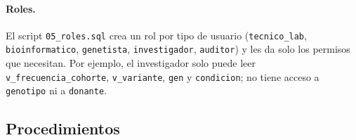 \paragraph{Roles.} El script \texttt{05\_\allowbreak{}roles.sql} crea un rol por tipo de usuario (\texttt{tecnico\_\allowbreak{}lab},
\texttt{bioinformatico}, \texttt{genetista}, \texttt{investigador}, \texttt{auditor}) y les da solo los permisos que
necesitan. Por ejemplo, el investigador solo puede leer \texttt{v\_\allowbreak{}frecuencia\_\allowbreak{}cohorte}, \texttt{v\_\allowbreak{}variante},
\texttt{gen} y \texttt{condicion}; no tiene acceso a \texttt{genotipo} ni a \texttt{donante}.

\subsection{Procedimientos}\label{sec:procs}

